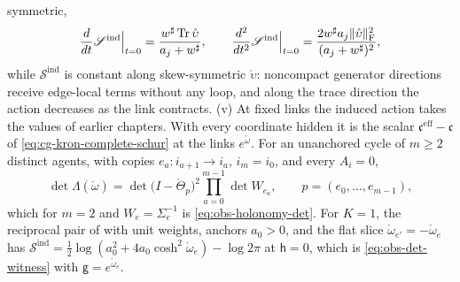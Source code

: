 symmetric,
\begin{equation}
\frac{d}{dt}\mathscr S^{\mathrm{ind}}\Big|_{t=0}=\frac{w^\sharp\operatorname{Tr}\mathring\upsilon}{a_j+w^\sharp},
\qquad
\frac{d^2}{dt^2}\mathscr S^{\mathrm{ind}}\Big|_{t=0}=\frac{2w^\sharp a_j\lVert\mathring\upsilon\rVert_{\mathrm F}^2}{(a_j+w^\sharp)^2},
\label{eq:glink-edge-mass}
\end{equation}
while \(\mathscr S^{\mathrm{ind}}\) is constant along skew-symmetric \(\mathring\upsilon\): noncompact generator
directions receive edge-local terms without any loop, and along the trace direction the action
decreases as the link contracts.
(v) At fixed links the induced action takes the values of earlier chapters. With every coordinate
hidden it is the scalar \(\mathfrak c^{\mathrm{eff}}-\mathfrak c\) of \eqref{eq:cg-kron-complete-schur}
at the links \(e^{\mathring\omega}\). For an unanchored cycle of \(m\geq2\) distinct agents, with copies
\(e_a:i_{a+1}\to i_a\), \(i_m=i_0\), and every \(A_i=0\),
\begin{equation}
\det\Lambda(\mathring\omega)=\det\bigl(I-\mathring\Theta_p\bigr)^2\prod_{a=0}^{m-1}\det W_{e_a},
\qquad p=(e_0,\ldots,e_{m-1}),
\label{eq:glink-cycle-determinant}
\end{equation}
which for \(m=2\) and \(W_e=\Sigma_e^{-1}\) is \eqref{eq:obs-holonomy-det}. For \(K=1\), the reciprocal
pair of  with unit weights, anchors \(a_0>0\), and the flat
slice \(\mathring\omega_{e'}=-\mathring\omega_e\) has
\(\mathscr S^{\mathrm{ind}}=\tfrac12\log(a_0^2+4a_0\cosh^2\mathring\omega_e)-\log2\pi\) at
\(\mathsf h=0\), which is \eqref{eq:obs-det-witness} with \(\mathsf g=e^{\mathring\omega_e}\).

